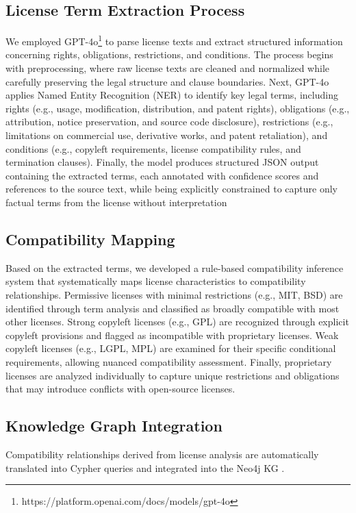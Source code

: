 \subsection{License Term Extraction Process}
We employed GPT-4o\footnote{https://platform.openai.com/docs/models/gpt-4o} to parse license texts and extract structured information concerning rights, obligations, restrictions, and conditions. The process begins with preprocessing, where raw license texts are cleaned and normalized while carefully preserving the legal structure and clause boundaries. Next, GPT-4o applies Named Entity Recognition (NER) \cite{wang2022llmner,chen2023gptner}  to identify key legal terms, including rights (e.g., usage, modification, distribution, and patent rights), obligations (e.g., attribution, notice preservation, and source code disclosure), restrictions (e.g., limitations on commercial use, derivative works, and patent retaliation), and conditions (e.g., copyleft requirements, license compatibility rules, and termination clauses). Finally, the model produces structured JSON output containing the extracted terms, each annotated with confidence scores and references to the source text, while being explicitly constrained to capture only factual terms from the license without interpretation

\subsection{Compatibility Mapping}

Based on the extracted terms, we developed a rule-based compatibility inference system that systematically maps license characteristics to compatibility relationships. Permissive licenses with minimal restrictions (e.g., MIT, BSD) are identified through term analysis and classified as broadly compatible with most other licenses. Strong copyleft licenses (e.g., GPL) are recognized through explicit copyleft provisions and flagged as incompatible with proprietary licenses. Weak copyleft licenses (e.g., LGPL, MPL) are examined for their specific conditional requirements, allowing nuanced compatibility assessment. Finally, proprietary licenses are analyzed individually to capture unique restrictions and obligations that may introduce conflicts with open-source licenses.

\subsection{Knowledge Graph Integration}
Compatibility relationships derived from license analysis are automatically translated into Cypher queries and integrated into the Neo4j KG \cite{GuiaSB17}.


